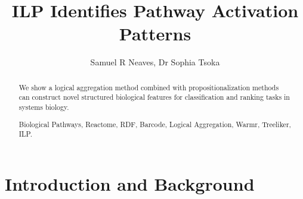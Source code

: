 \documentclass[runningheads,a4paper]{llncs}
\newcommand{\keywords}[1]{\par\addvspace\baselineskip
\noindent\keywordname\enspace\ignorespaces#1}
\begin{document}
\mainmatter  %


\title{ILP Identifies Pathway Activation Patterns}

%
%
\author{Samuel R Neaves, Dr Sophia Tsoka}
%


%
%

\maketitle


\begin{abstract}
We show a logical aggregation method combined 
with propositionalization methods can construct novel structured biological features for 	classification and ranking tasks in systems biology. 

\keywords{Biological Pathways, Reactome, RDF, Barcode, Logical Aggregation, Warmr, Treeliker, ILP.}
\end{abstract}



\section{Introduction and Background}
\end{document}
